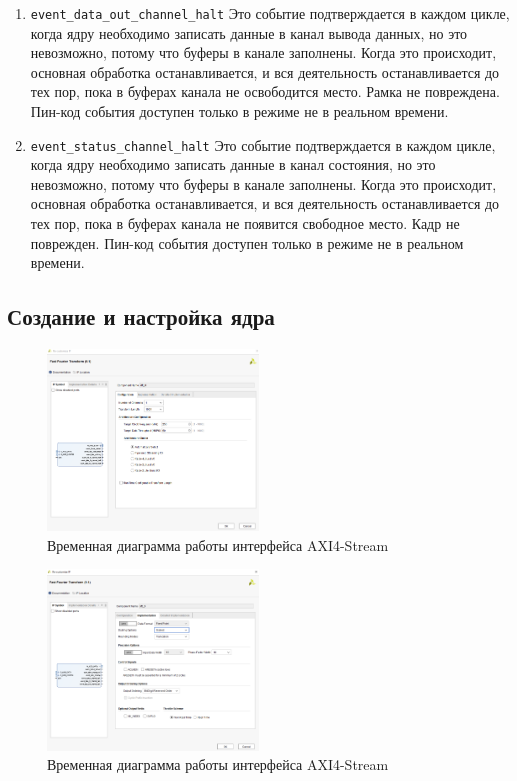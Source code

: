 \begin{enumerate}
	\item \verb|event_data_out_channel_halt|
	Это событие подтверждается в каждом цикле, когда ядру необходимо записать данные в канал вывода данных, но это невозможно, потому что буферы в канале заполнены. Когда это происходит, основная обработка останавливается, и вся деятельность останавливается до тех пор, пока в буферах канала не освободится место. Рамка не повреждена. Пин-код события доступен только в режиме не в реальном времени.
	\item \verb|event_status_channel_halt|
	Это событие подтверждается в каждом цикле, когда ядру необходимо записать данные в канал состояния, но это невозможно, потому что буферы в канале заполнены. Когда это происходит, основная обработка останавливается, и вся деятельность останавливается до тех пор, пока в буферах канала не появится свободное место. Кадр не поврежден. Пин-код события доступен только в режиме не в реальном времени.
\end{enumerate}

\subsection{Создание и настройка ядра}

\begin{figure}[h]
	\centering
	\includegraphics[width=0.5\textwidth]{image/fft_config.png}
	\caption{Временная диаграмма работы интерфейса AXI4-Stream}
	\label{fft_config}
\end{figure}
	
\begin{figure}[h]
	\centering
	\includegraphics[width=0.5\textwidth]{image/fft_implemetation.png}
	\caption{Временная диаграмма работы интерфейса AXI4-Stream}
	\label{fft_implemetation}
\end{figure}
	
